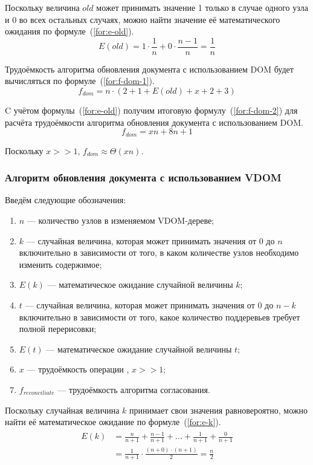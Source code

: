 Поскольку величина $old$ может принимать значение 1 только в случае одного узла и 0 во всех остальных случаях, можно найти значение её математического ожидания по формуле~(\ref{for:e-old}).
\begin{equation}
	\label{for:e-old}
	E(old) = 1 \cdot \frac{1}{n} + 0 \cdot \frac{n - 1}{n} = \frac{1}{n}
\end{equation}

Трудоёмкость алгоритма обновления документа с использованием DOM будет вычисляться по формуле~(\ref{for:f-dom-1}).
\begin{equation}
	\label{for:f-dom-1}
	f_{dom} = n \cdot (2 + 1 + E(old) + x + 2 + 3)
\end{equation}

C учётом формулы~(\ref{for:e-old}) получим итоговую формулу~(\ref{for:f-dom-2}) для расчёта трудоёмкости алгоритма обновления документа с использованием DOM.
\begin{equation}
	\label{for:f-dom-2}
	f_{dom} = xn + 8n + 1
\end{equation}

Поскольку $x >> 1$, $f_{dom} \approx \Theta(xn)$.

\subsubsection{Алгоритм обновления документа с использованием VDOM}
Введём следующие обозначения:
\begin{enumerate}[label=\arabic*)]
	\item $n$ --- количество узлов в изменяемом VDOM-дереве;
	\item $k$ --- случайная величина, которая может принимать значения от 0 до $n$ включительно в зависимости от того, в каком количестве узлов необходимо изменить содержимое;
	\item $E(k)$ --- математическое ожидание случайной величины $k$;
	\item $t$ --- случайная величина, которая может принимать значения от 0 до $n - k$ включительно в зависимости от того, какое количество поддеревьев требует полной перерисовки;
	\item $E(t)$ --- математическое ожидание случайной величины $t$;
	\item $x$ --- трудоёмкость операции , $x >> 1$;
	\item $f_{reconciliate}$ --- трудоёмкость алгоритма согласования.
\end{enumerate}

Поскольку случайная величина $k$ принимает свои значения равновероятно, можно найти её математическое ожидание по формуле~(\ref{for:e-k}).
\begin{align}
	\begin{split}
		\label{for:e-k}
		E(k) &= \frac{n}{n + 1} + \frac{n - 1}{n + 1}  + \dotsc + \frac{1}{n + 1} + \frac{0}{n + 1} \\
		&= \frac{1}{n + 1} \cdot \frac{(n + 0)\cdot(n + 1)}{2} = \frac{n}{2}
	\end{split}
\end{align}

